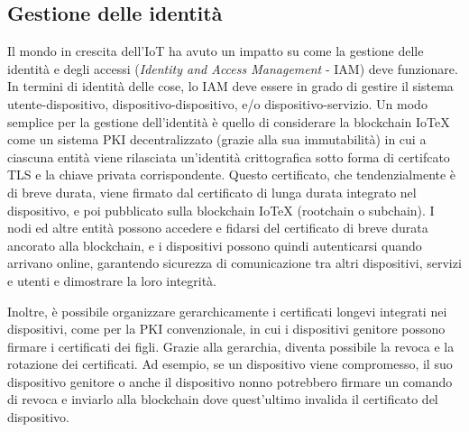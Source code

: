 \subsection{Gestione delle identità}
Il mondo in crescita dell'IoT ha avuto un impatto su come la gestione delle identità e degli accessi (\emph{Identity and Access Management} - IAM)
deve funzionare. In termini di identità delle cose, lo IAM deve essere in grado di gestire il sistema utente-dispositivo, dispositivo-dispositivo, e/o dispositivo-servizio. Un modo semplice per la gestione dell'identità è quello di considerare la blockchain IoTeX come un sistema PKI decentralizzato
(grazie alla sua immutabilità) in cui a ciascuna entità viene rilasciata un'identità crittografica sotto forma di certifcato TLS e la chiave privata corrispondente. Questo certificato, che tendenzialmente è di breve durata, viene firmato dal certificato di lunga durata integrato nel dispositivo, e poi pubblicato sulla blockchain IoTeX (rootchain o subchain). I nodi ed altre entità possono accedere e fidarsi del certificato di breve durata ancorato alla
blockchain, e i dispositivi possono quindi autenticarsi quando arrivano online, garantendo sicurezza di comunicazione tra altri dispositivi, servizi e utenti e dimostrare la loro integrità.

Inoltre, è possibile organizzare gerarchicamente i certificati longevi integrati nei dispositivi, come per la PKI convenzionale, in cui i dispositivi genitore possono firmare i certificati dei figli. Grazie alla gerarchia, diventa possibile la revoca e la rotazione dei certificati. Ad esempio, se un dispositivo viene compromesso, il suo dispositivo genitore o anche il dispositivo nonno potrebbero firmare un comando di revoca e inviarlo alla blockchain dove quest'ultimo invalida il certificato del dispositivo.